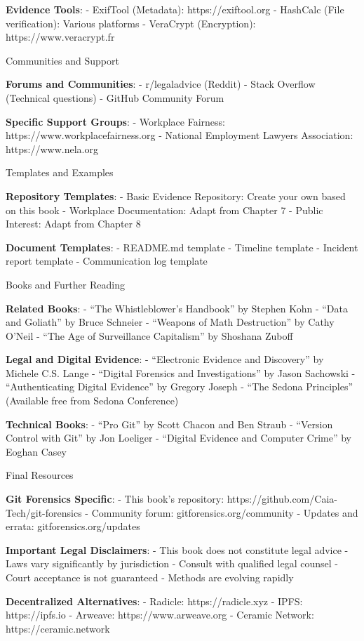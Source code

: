 \textbf{Evidence Tools}: - ExifTool (Metadata): https://exiftool.org -
HashCalc (File verification): Various platforms - VeraCrypt
(Encryption): https://www.veracrypt.fr

Communities and Support

\textbf{Forums and Communities}: - r/legaladvice (Reddit) - Stack
Overflow (Technical questions) - GitHub Community Forum

\textbf{Specific Support Groups}: - Workplace Fairness:
https://www.workplacefairness.org - National Employment Lawyers
Association: https://www.nela.org

Templates and Examples

\textbf{Repository Templates}: - Basic Evidence Repository: Create your
own based on this book - Workplace Documentation: Adapt from Chapter 7 -
Public Interest: Adapt from Chapter 8

\textbf{Document Templates}: - README.md template - Timeline template -
Incident report template - Communication log template

Books and Further Reading

\textbf{Related Books}: - ``The Whistleblower's Handbook'' by Stephen
Kohn - ``Data and Goliath'' by Bruce Schneier - ``Weapons of Math
Destruction'' by Cathy O'Neil - ``The Age of Surveillance Capitalism''
by Shoshana Zuboff

\textbf{Legal and Digital Evidence}: - ``Electronic Evidence and
Discovery'' by Michele C.S. Lange - ``Digital Forensics and
Investigations'' by Jason Sachowski - ``Authenticating Digital
Evidence'' by Gregory Joseph - ``The Sedona Principles'' (Available free
from Sedona Conference)

\textbf{Technical Books}: - ``Pro Git'' by Scott Chacon and Ben Straub -
``Version Control with Git'' by Jon Loeliger - ``Digital Evidence and
Computer Crime'' by Eoghan Casey

Final Resources

\textbf{Git Forensics Specific}: - This book's repository:
https://github.com/Caia-Tech/git-forensics - Community forum:
gitforensics.org/community - Updates and errata:
gitforensics.org/updates

\textbf{Important Legal Disclaimers}: - This book does not constitute
legal advice - Laws vary significantly by jurisdiction - Consult with
qualified legal counsel - Court acceptance is not guaranteed - Methods
are evolving rapidly

\textbf{Decentralized Alternatives}: - Radicle: https://radicle.xyz -
IPFS: https://ipfs.io - Arweave: https://www.arweave.org - Ceramic
Network: https://ceramic.network

